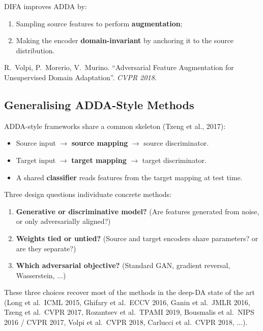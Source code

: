 \documentclass[11pt,a4paper]{article}
\theoremstyle{definition}
\theoremstyle{plain}
\theoremstyle{remark}
\begin{document}
DIFA improves ADDA by:
\begin{enumerate}
    \item Sampling source features to perform \textbf{augmentation};
    \item Making the encoder \textbf{domain-invariant} by anchoring it to the source distribution.
\end{enumerate}

\begin{tcolorbox}[colback=blue!5!white,colframe=blue!60!black,title={Reference}]
R.\ Volpi, P.\ Morerio, V.\ Murino. ``Adversarial Feature Augmentation for Unsupervised Domain Adaptation''. \textit{CVPR 2018}.
\end{tcolorbox}

\subsection{Generalising ADDA-Style Methods}

ADDA-style frameworks share a common skeleton (Tzeng et al., 2017):

\begin{itemize}
    \item Source input $\to$ \textbf{source mapping} $\to$ source discriminator.
    \item Target input $\to$ \textbf{target mapping} $\to$ target discriminator.
    \item A shared \textbf{classifier} reads features from the target mapping at test time.
\end{itemize}

Three design questions individuate concrete methods:
\begin{enumerate}
    \item \textbf{Generative or discriminative model?} (Are features generated from noise, or only adversarially aligned?)
    \item \textbf{Weights tied or untied?} (Source and target encoders share parameters? or are they separate?)
    \item \textbf{Which adversarial objective?} (Standard GAN, gradient reversal, Wasserstein, $\ldots$)
\end{enumerate}

These three choices recover most of the methods in the deep-DA state of the art (Long et al.\ ICML 2015, Ghifary et al.\ ECCV 2016, Ganin et al.\ JMLR 2016, Tzeng et al.\ CVPR 2017, Rozantsev et al.\ TPAMI 2019, Bousmalis et al.\ NIPS 2016 / CVPR 2017, Volpi et al.\ CVPR 2018, Carlucci et al.\ CVPR 2018, $\ldots$).
\end{document}
